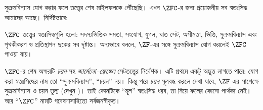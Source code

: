\documentclass[../../../include/open-logic-section]{subfiles}
\begin{document}

সুক্রমবিন্যাস যোগ করার ফলে তত্ত্বের শেষ মাইলফলকে পৌঁছেছি।
এখন $\ZFC$-র জন্য প্রয়োজনীয় সব স্বতঃসিদ্ধ আমাদের আছে।
নির্দিষ্টভাবে:

\begin{defn}
$\ZFC$ তত্ত্বের স্বতঃসিদ্ধগুলি হলো: সদস্যভিত্তিক সমতা, সংযোগ,
যুগল, ঘাত সেট, অসীমতা, ভিত্তি, সুক্রমবিন্যাস এবং পৃথকীকরণ ও
প্রতিস্থাপন ছকের সব দৃষ্টান্ত। অন্যভাবে বললে, $\ZF$-এর
সঙ্গে সুক্রমবিন্যাস যোগ করলেই $\ZFC$ পাওয়া যায়।
\end{defn}

$\ZFC$-র শেষ অক্ষরটি \emph{চয়ন}-সহ \emph{জার্মেলো--ফ্রেঙ্কেল}
সেটতত্ত্বের নির্দেশক। এটি প্রথমে একটু অদ্ভুত লাগতে পারে:
যোগ করা স্বতঃসিদ্ধের নাম তো ``সুক্রমবিন্যাস'', ``চয়ন'' নয়।
কিন্তু পরে \emph{চয়ন} সূত্রবদ্ধ করলে দেখা যাবে, $\ZF$-এর
সাপেক্ষে সুক্রমবিন্যাস ও চয়ন তুল্য
(দেখুন )। তাই কোনটিকে
``মূল'' স্বতঃসিদ্ধ ধরব, তা নিয়ে ফলের কোনো পার্থক্য নেই।
আর ``$\ZFC$'' নামটি গবেষণাসাহিত্যে সর্বজনস্বীকৃত।
\end{document}
